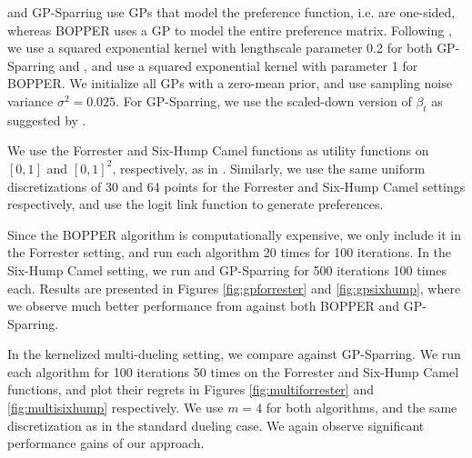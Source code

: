 \kersparring and GP-Sparring use GPs that model the preference function, i.e. are one-sided, whereas BOPPER uses a GP to model the entire preference matrix. Following \citet{srinivas10}, we use a squared exponential kernel with lengthscale parameter 0.2 for both GP-Sparring and \kersparring, and use a squared exponential kernel with parameter 1 for BOPPER. We initialize all GPs with a zero-mean prior, and use sampling noise variance $\sigma^2=0.025$. For GP-Sparring, we use the scaled-down version of $\beta_t$ as suggested by \citet{srinivas10}.
 
We use the Forrester and Six-Hump Camel functions as utility functions on $[0,1]$ and $[0,1]^2$, respectively, as in \citet{gonzalez2016bayesian}. Similarly, we use the same uniform discretizations of 30 and 64 points for the Forrester and Six-Hump Camel settings respectively, and use the logit link function to generate preferences.

Since the BOPPER algorithm is computationally expensive, we only include it in the Forrester setting, and run each algorithm 20 times for 100 iterations. In the Six-Hump Camel setting, we run \kersparring and GP-Sparring for 500 iterations 100 times each. Results are presented in Figures \ref{fig:gpforrester} and \ref{fig:gpsixhump}, where we observe much better performance from \kersparring against both BOPPER and GP-Sparring.


In the kernelized multi-dueling setting, we compare against GP-Sparring.  We run each algorithm for 100 iterations 50 times on the Forrester and Six-Hump Camel functions, and plot their regrets in Figures \ref{fig:multiforrester} and \ref{fig:multisixhump} respectively. We use $m=4$ for both algorithms, and the same discretization as in the standard dueling case.  We again observe significant performance gains of our \kersparring approach.



